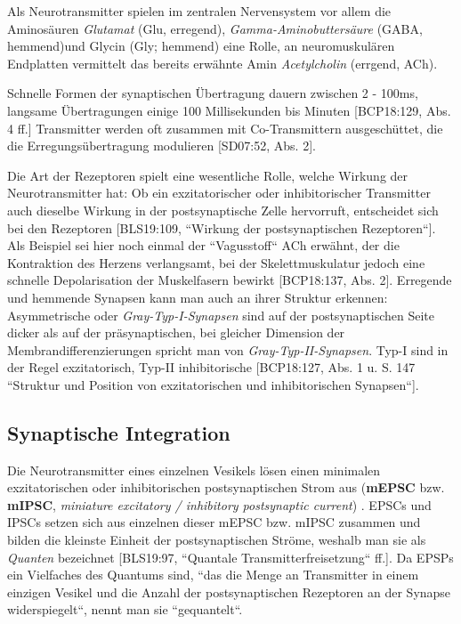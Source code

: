 {{Als Neurotransmitter spielen im zentralen Nervensystem vor allem  die Aminosäuren \textit{Glutamat} (Glu, erregend), \textit{Gamma-Aminobuttersäure} (GABA, hemmend)\footnotemark[60] und Glycin (Gly; hemmend) eine Rolle, an neuromuskulären Endplatten vermittelt das bereits erwähnte Amin \textit{Acetylcholin} (errgend, ACh).



Schnelle Formen der synaptischen Übertragung dauern zwischen 2 - 100ms, langsame Übertragungen einige 100 Millisekunden bis Minuten [BCP18:129, Abs. 4 ff.] Transmitter werden oft zusammen mit Co-Transmittern ausgeschüttet, die die Erregungsübertragung modulieren [SD07:52, Abs. 2].

Die Art der Rezeptoren spielt eine wesentliche Rolle, welche Wirkung der Neurotransmitter hat: Ob ein exzitatorischer oder inhibitorischer Transmitter auch dieselbe Wirkung in der postsynaptische Zelle hervorruft, entscheidet sich bei den Rezeptoren [BLS19:109, ``Wirkung der postsynaptischen Rezeptoren``]. 
Als Beispiel sei hier noch einmal der ``Vagusstoff`` ACh erwähnt, der die Kontraktion des Herzens verlangsamt, bei der Skelettmuskulatur jedoch eine schnelle Depolarisation der Muskelfasern bewirkt [BCP18:137, Abs. 2].
Erregende und hemmende Synapsen kann man auch an ihrer Struktur erkennen: Asymmetrische oder \textit{Gray-Typ-I-Synapsen} sind auf der postsynaptischen Seite dicker als auf der präsynaptischen, bei gleicher Dimension der Membrandifferenzierungen spricht man von \textit{Gray-Typ-II-Synapsen}. Typ-I sind in der Regel exzitatorisch, Typ-II inhibitorische  [BCP18:127, Abs. 1 u. S. 147 ``Struktur und Position von exzitatorischen und inhibitorischen Synapsen``].


\subsection{Synaptische Integration}

Die Neurotransmitter eines einzelnen Vesikels lösen einen minimalen exzitatorischen oder inhibitorischen postsynaptischen Strom aus (\textbf{mEPSC} bzw. \textbf{mIPSC}, \textit{miniature excitatory / inhibitory postsynaptic current}) . 
EPSCs und IPSCs setzen sich aus einzelnen dieser mEPSC bzw. mIPSC zusammen und bilden die kleinste Einheit der postsynaptischen Ströme, weshalb man sie als \textit{Quanten} bezeichnet [BLS19:97, ``Quantale Transmitterfreisetzung`` ff.]. 
Da EPSPs ein Vielfaches des Quantums sind, ``das die Menge an Transmitter in einem einzigen Vesikel und die Anzahl der postsynaptischen Rezeptoren an der Synapse widerspiegelt``, nennt man sie ``gequantelt``.

}}
